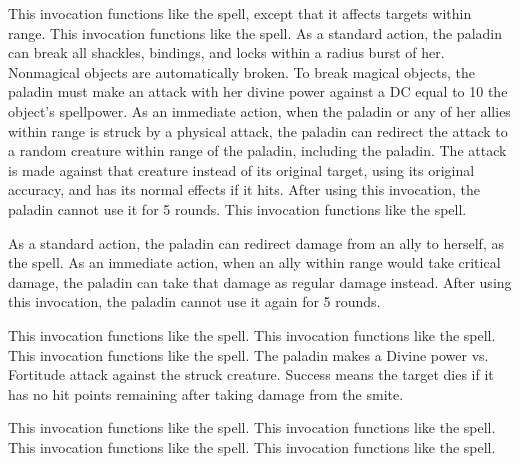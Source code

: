      This invocation functions like the  spell, except that it affects targets within \rngmed range.
     This invocation functions like the  spell.
    As a standard action, the paladin can break all shackles, bindings, and locks within a \arealarge radius burst of her.
    Nonmagical objects are automatically broken.
    To break magical objects, the paladin must make an attack with her divine power against a DC equal to 10 \add the object's spellpower.
    As an immediate action, when the paladin or any of her allies within \rngclose range is struck by a physical attack, the paladin can redirect the attack to a random creature within \rngclose range of the paladin, including the paladin.
    The attack is made against that creature instead of its original target, using its original accuracy, and has its normal effects if it hits.
    After using this invocation, the paladin cannot use it for 5 rounds.
     This invocation functions like the  spell.

    As a standard action, the paladin can redirect damage from an ally to herself, as the  spell.
    As an immediate action, when an ally within \rngmed range would take critical damage, the paladin can take that damage as regular damage instead.
    After using this invocation, the paladin cannot use it again for 5 rounds.

     This invocation functions like the 
    spell.
     This invocation functions like the  spell.
     This invocation functions like the 
    spell.
    The paladin makes a Divine power vs. Fortitude attack against the struck creature.
    Success means the target dies if it has no hit points remaining after taking damage from the smite.

     This invocation functions like the  spell.
     This invocation functions like the  spell.
     This invocation functions like the  spell.
     This invocation functions like the  spell.

